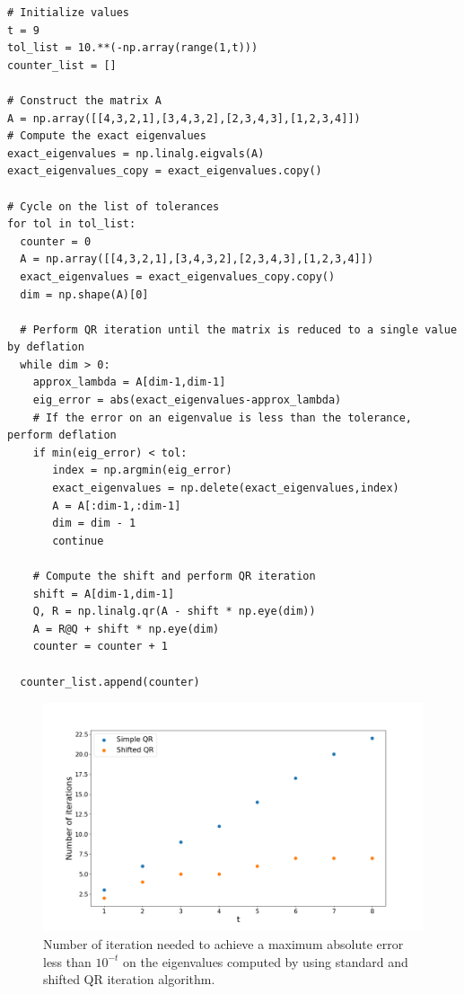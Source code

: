\documentclass[a4paper,11pt]{article}
\begin{document}
\begin{verbatim}
# Initialize values
t = 9
tol_list = 10.**(-np.array(range(1,t)))
counter_list = []

# Construct the matrix A
A = np.array([[4,3,2,1],[3,4,3,2],[2,3,4,3],[1,2,3,4]])
# Compute the exact eigenvalues
exact_eigenvalues = np.linalg.eigvals(A)
exact_eigenvalues_copy = exact_eigenvalues.copy()

# Cycle on the list of tolerances
for tol in tol_list:
  counter = 0
  A = np.array([[4,3,2,1],[3,4,3,2],[2,3,4,3],[1,2,3,4]])
  exact_eigenvalues = exact_eigenvalues_copy.copy()
  dim = np.shape(A)[0]

  # Perform QR iteration until the matrix is reduced to a single value by deflation
  while dim > 0:
    approx_lambda = A[dim-1,dim-1]
    eig_error = abs(exact_eigenvalues-approx_lambda)
    # If the error on an eigenvalue is less than the tolerance, perform deflation
    if min(eig_error) < tol:
       index = np.argmin(eig_error)
       exact_eigenvalues = np.delete(exact_eigenvalues,index)
       A = A[:dim-1,:dim-1]
       dim = dim - 1 
       continue

    # Compute the shift and perform QR iteration
    shift = A[dim-1,dim-1]
    Q, R = np.linalg.qr(A - shift * np.eye(dim))
    A = R@Q + shift * np.eye(dim)
    counter = counter + 1

  counter_list.append(counter)
\end{verbatim}

\begin{figure}[H]
	\centering
	\includegraphics[scale=0.40]{Plot/Plot_QR_Standard_Rayleigh.png}
	\caption{Number of iteration needed to achieve a maximum absolute error less than $10^{-t}$ on the eigenvalues computed by using standard and shifted QR iteration algorithm.}
	\label{Fig:Num_iter_with_t}
\end{figure}
\end{document}
